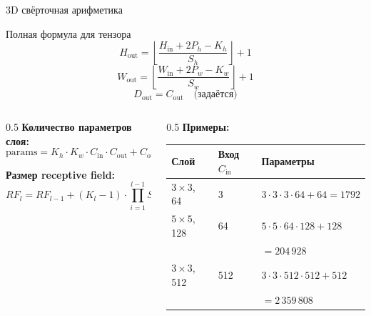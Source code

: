 \documentclass[aspectratio=169, 9pt]{beamer}
\begin{document}
\begin{frame}{3D свёрточная арифметика}
  \begin{block}{Полная формула для тензора}
    \[
    H_{\text{out}} = \left\lfloor \frac{H_{\text{in}} + 2P_h - K_h}{S_h} \right\rfloor + 1
    \]
    \[
    W_{\text{out}} = \left\lfloor \frac{W_{\text{in}} + 2P_w - K_w}{S_w} \right\rfloor + 1
    \]
    \[
    D_{\text{out}} = C_{\text{out}} \quad\text{(задаётся)}
    \]
  \end{block}
  
  \begin{columns}[T]
    \begin{column}{0.5\textwidth}
      \textbf{Количество параметров слоя:}
      \[
      \text{params} = K_h \cdot K_w \cdot C_{\text{in}} \cdot C_{\text{out}} + C_{\text{out}}
      \]
      
      \textbf{Размер receptive field:}
      \[
      RF_{l} = RF_{l-1} + (K_l - 1) \cdot \prod_{i=1}^{l-1} S_i
      \]
    \end{column}
    \begin{column}{0.5\textwidth}
      \textbf{Примеры:}
      
      \begin{tabular}{lll}
        \toprule
        Слой & Вход $C_{\text{in}}$ & Параметры \\
        \midrule
        $3\times3$, 64 & 3 & $3\cdot3\cdot3\cdot64 + 64 = 1792$ \\
        $5\times5$, 128 & 64 & $5\cdot5\cdot64\cdot128 + 128$ \\
        & & $= 204\,928$ \\
        $3\times3$, 512 & 512 & $3\cdot3\cdot512\cdot512 + 512$ \\
        & & $= 2\,359\,808$ \\
        \bottomrule
      \end{tabular}
    \end{column}
  \end{columns}
\end{frame}
\end{document}
